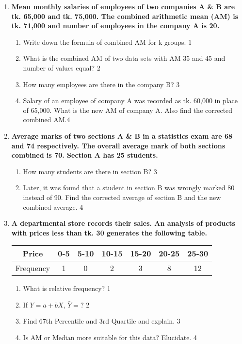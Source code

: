 \documentclass[a4paper,oneside]{book}
\begin{document}
\begin{enumerate}
   \item
	  \textbf{Mean monthly salaries of employees of two companies A \& B are tk. 
	  65,000 and tk. 75,000. The combined arithmetic mean (AM) is tk. 
	  71,000 and number of employees in the company A is 20.} 
	  
  \begin{enumerate}
    \item
	Write down the formula of combined AM for k groups. \hfill 1
    \item
	What is the combined AM of two data sets with AM 35 and 45 and number of values equal? \hfill 2
    \item  
	How many employees are there in the company B? \hfill 3
    \item
	Salary of an employee of company A was recorded as tk. 60,000 in place of
	65,000. What is the new AM of company A. Also find the corrected combined AM.\hfill 4
  \end{enumerate}
  
  \item
\textbf{Average marks of two sections A \& B in a statistics exam are 68 and 74 respectively. The overall average mark of both sections combined is 70. Section A has 25 students.}

\begin{enumerate}
    \item  
    How many students are there in section B? \hfill 3
    \item
    Later, it was found that a student in section B was wrongly marked 80 instead of 90. Find the corrected average of section B and the new combined average. \hfill 4
\end{enumerate}


     \item
	  \textbf{A departmental store records their sales. An analysis of products with prices less than tk. 30 generates the following table.} 
	  
\begin{table}[H]
\centering
\begin{tabular}{c|c|c|c|c|c|c}
Price     & 0-5 & 5-10 & 10-15 & 15-20 & 20-25 & 25-30 \\ \hline
Frequency & 1   & 0    & 2     & 3     & 8     & 12   
\end{tabular}
\end{table}
  
  \begin{enumerate}
    \item
	What is relative frequency? \hfill 1
    \item
	If $Y = a + bX$, $\bar Y = ?$ \hfill 2
    \item  
	Find 67th Percentile and 3rd Quartile and explain. \hfill 3
    \item
	Is AM or Median more suitable for this data? Elucidate. \hfill 4
  \end{enumerate}


\end{enumerate}
\end{document}
